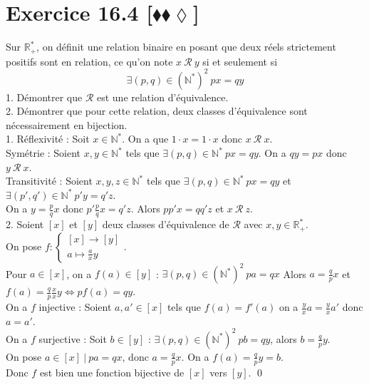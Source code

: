 \documentclass[10pt]{article}
\begin{document}
\section*{Exercice 16.4 [$\blacklozenge\blacklozenge\lozenge$]}
\begin{tcolorbox}[enhanced, width=7.6in, center, size=fbox, fontupper=\large, drop shadow southwest]
    Sur $\mathbb{R}^*_+$, on définit une relation binaire en posant que deux réels strictement positifs sont en relation, ce qu'on note $x~\mathcal{R}~y$ si et seulement si
    \begin{equation*}
        \exists(p,q)\in(\mathbb{N}^*)^2 ~ px = qy
    \end{equation*}
    1. Démontrer que $\mathcal{R}$ est une relation d'équivalence.\\
    2. Démontrer que pour cette relation, deux classes d'équivalence sont nécessairement en bijection.\\[0.2cm]
    1. Réflexivité : Soit $x\in\mathbb{N}^*$. On a que $1\cdot x = 1\cdot x$ donc $x ~ \mathcal{R} ~ x$.\\
    Symétrie : Soient $x,y\in\mathbb{N}^*$ tels que $\exists(p,q)\in\mathbb{N}^* ~ px = qy$. On a $qy = px$ donc $y ~ \mathcal{R} ~ x$.\\
    Transitivité : Soient $x,y,z\in\mathbb{N}^*$ tels que $\exists(p,q)\in\mathbb{N}^*~px=qy$ et $\exists(p',q')\in\mathbb{N}^*~p'y=q'z$.\\
    On a $y=\frac{p}{q}x$ donc $p'\frac{p}{q}x=q'z$. Alors $pp'x=qq'z$ et $x~\mathcal{R}~z$.\\[0.15cm]
    2. Soient $[x]$ et $[y]$ deux classes d'équivalence de $\mathcal{R}$ avec $x,y\in\mathbb{R}^*_+$.\\
    On pose $f:\begin{cases}
        [x] \to [y]\\
        a\mapsto \frac{a}{x}y
    \end{cases}$.\\
    Pour $a\in[x]$, on a $f(a)\in[y]$ : $\exists (p,q)\in(\mathbb{N}^*)^2 ~ pa = qx$ Alors $a=\frac{q}{p}x$ et $f(a)=\frac{q}{p}\frac{x}{x}y \iff pf(a)=qy$.\\
    On a $f$ injective : Soient $a,a'\in[x]$ tels que $f(a)=f'(a)$ on a $\frac{y}{x}a=\frac{y}{x}a'$ donc $a=a'$.\\
    On a $f$ surjective : Soit $b\in[y]$ : $\exists(p,q)\in(\mathbb{N}^*)^2 ~ pb = qy$, alors $b=\frac{q}{p}y$.\\
    On pose $a\in[x] ~ | ~ pa=qx$, donc $a=\frac{q}{p}x$. On a $f(a)=\frac{q}{p}y=b$.\\
    Donc $f$ est bien une fonction bijective de $[x]$ vers $[y]$.
    \qed
\end{tcolorbox}
\end{document}
